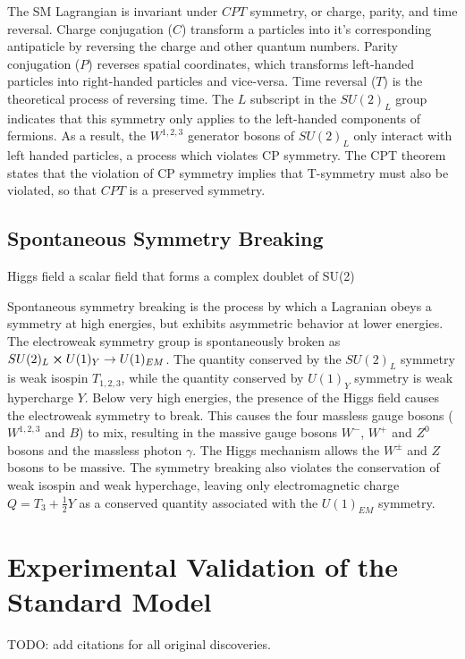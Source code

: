 The SM Lagrangian is invariant under $CPT$ symmetry, or charge, parity, and time reversal. Charge conjugation ($C$) transform a particles into it's corresponding antipaticle by reversing the charge and other quantum numbers. Parity conjugation ($P$) reverses spatial coordinates, which transforms left-handed particles into right-handed particles and vice-versa. Time reversal ($T$) is the theoretical process of reversing time. The $L$ subscript in the $SU(2)_L$ group indicates that this symmetry only applies to the left-handed components of fermions. As a result, the $W^{1,2,3}$ generator bosons of $SU(2)_L$ only interact with left handed particles, a process which violates CP symmetry. The CPT theorem states that the violation of CP symmetry implies that T-symmetry must also be violated, so that $CPT$ is a preserved symmetry.

\subsection{Spontaneous Symmetry Breaking}
Higgs field a scalar field that forms a complex doublet of SU(2) 

Spontaneous symmetry breaking is the process by which a Lagranian obeys a symmetry at high energies, but exhibits asymmetric behavior at lower energies. The electroweak symmetry group is spontaneously broken as $SU(2)_L \cross U(1)_Y \rightarrow U(1)_{EM}$. The quantity conserved by the $SU(2)_L$ symmetry is weak isospin $T_{1,2,3}$, while the quantity conserved by $U(1)_Y$ symmetry is weak hypercharge $Y$. Below very high energies, the presence of the Higgs field causes the electroweak symmetry to break. This causes the four massless gauge bosons ($W^{1,2,3}$ and $B$) to mix, resulting in the massive gauge bosons $W^-$, $W^+$ and $Z^0$ bosons and the massless photon $\gamma$. The Higgs mechanism allows the $W^\pm$ and $Z$ bosons to be massive. The symmetry breaking also violates the conservation of weak isospin and weak hyperchage, leaving only electromagnetic charge $Q = T_3 + \frac{1}{2}Y$ as a conserved quantity associated with the $U(1)_{EM}$ symmetry. \par


\section{Experimental Validation of the Standard Model}
TODO: add citations for all original discoveries.\\

